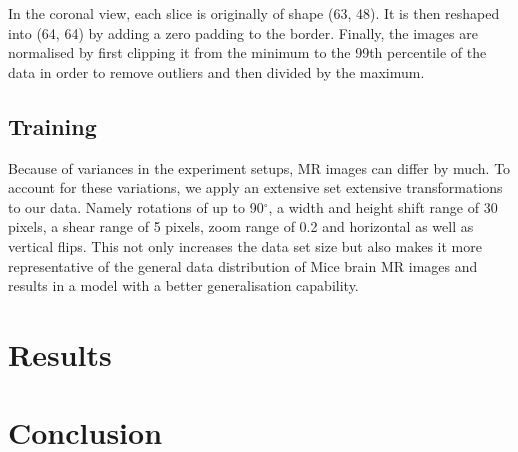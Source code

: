 \documentclass{article}
\begin{document}
In the coronal view, each slice is originally of shape (63, 48). 
It is then reshaped into (64, 64) by adding a zero padding to the border. 
Finally, the images are normalised by first clipping it from the minimum to the 99th percentile of the data in order to remove outliers and then divided by the maximum.

\subsection{Training}

Because of variances in the experiment setups, MR images can differ by much. 
To account for these variations, we apply an extensive set extensive transformations to our data. Namely rotations of up to 90$^{\circ}$, a width and height shift range of 30 pixels, a shear range of 5 pixels, zoom range of 0.2 and horizontal as well as vertical flips. 
This not only increases the data set size but also makes it more representative of the general data distribution of Mice brain MR images and results in a model with a better generalisation capability.
  
\section{Results}

\section{Conclusion}


  

\end{document}

